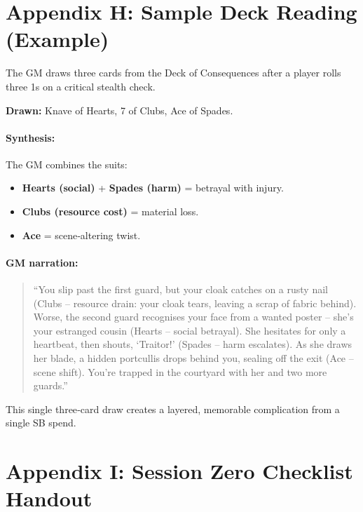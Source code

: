 \clearpage
\section*{Appendix H: Sample Deck Reading (Example)}
\label{app:sample-reading}

The GM draws three cards from the Deck of Consequences after a player rolls three 1s on a critical stealth check.

\textbf{Drawn:} Knave of Hearts, 7 of Clubs, Ace of Spades.

\paragraph{Synthesis:} The GM combines the suits:
\begin{itemize}
  \item \textbf{Hearts (social)} + \textbf{Spades (harm)} = betrayal with injury.
  \item \textbf{Clubs (resource cost)} = material loss.
  \item \textbf{Ace} = scene‑altering twist.
\end{itemize}

\paragraph{GM narration:}
\begin{quote}
“You slip past the first guard, but your cloak catches on a rusty nail (Clubs – resource drain: your cloak tears, leaving a scrap of fabric behind). Worse, the second guard recognises your face from a wanted poster – she’s your estranged cousin (Hearts – social betrayal). She hesitates for only a heartbeat, then shouts, ‘Traitor!’ (Spades – harm escalates). As she draws her blade, a hidden portcullis drops behind you, sealing off the exit (Ace – scene shift). You’re trapped in the courtyard with her and two more guards.”
\end{quote}

\noindent This single three‑card draw creates a layered, memorable complication from a single SB spend.

\clearpage
\section*{Appendix I: Session Zero Checklist Handout}
\label{app:session-zero-handout}

